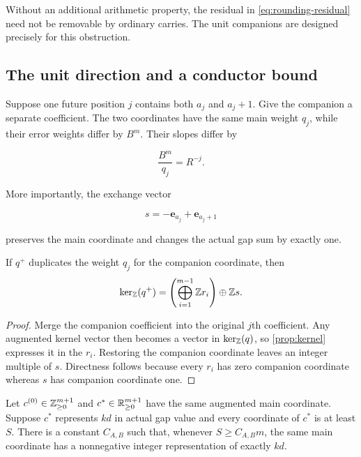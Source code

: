 Without an additional arithmetic property, the residual in
\eqref{eq:rounding-residual} need not be removable by ordinary carries.  The
unit companions are designed precisely for this obstruction.

\subsection{The unit direction and a conductor bound}

Suppose one future position $j$ contains both $a_j$ and $a_j+1$.  Give the
companion a separate coefficient.  The two coordinates have the same main
weight $q_j$, while their error weights differ by $B^m$.  Their slopes differ
by

\begin{equation}
  \frac{B^m}{q_j}=R^{-j}.
  \label{eq:unit-slope-width}
\end{equation}

More importantly, the exchange vector

\begin{equation}
  s=-\mathbf e_{a_j}+\mathbf e_{a_j+1}
  \label{eq:unit-direction}
\end{equation}

preserves the main coordinate and changes the actual gap sum by exactly one.

\begin{proposition}
  \label{prop:augmented-kernel}
  If $q^+$ duplicates the weight $q_j$ for the companion coordinate, then
  \[
    \ker_{\mathbb{Z}}(q^+)
    =\left(\bigoplus_{i=1}^{m-1}\mathbb{Z} r_i\right)\oplus\mathbb{Z} s.
  \]
\end{proposition}

\begin{proof}
  Merge the companion coefficient into the original $j$th coefficient.  Any
  augmented kernel vector then becomes a vector in $\ker_{\mathbb{Z}}(q)$, so
  \cref{prop:kernel} expresses it in the $r_i$.  Restoring the companion
  coordinate leaves an integer multiple of $s$.  Directness follows because
  every $r_i$ has zero companion coordinate whereas $s$ has companion
  coordinate one.
\end{proof}

\begin{lemma}
  \label{lem:augmented-rounding}
  Let $c^{(0)}\in\mathbb{Z}_{\ge0}^{m+1}$ and
  $c^*\in\mathbb{R}_{\ge0}^{m+1}$ have the same augmented main coordinate.  Suppose
  $c^*$ represents $kd$ in actual gap value and every coordinate of $c^*$ is
  at least $S$.  There is a constant $C_{A,B}$ such that, whenever
  $S\ge C_{A,B}m$, the same main coordinate has a nonnegative integer
  representation of exactly $kd$.
\end{lemma}

